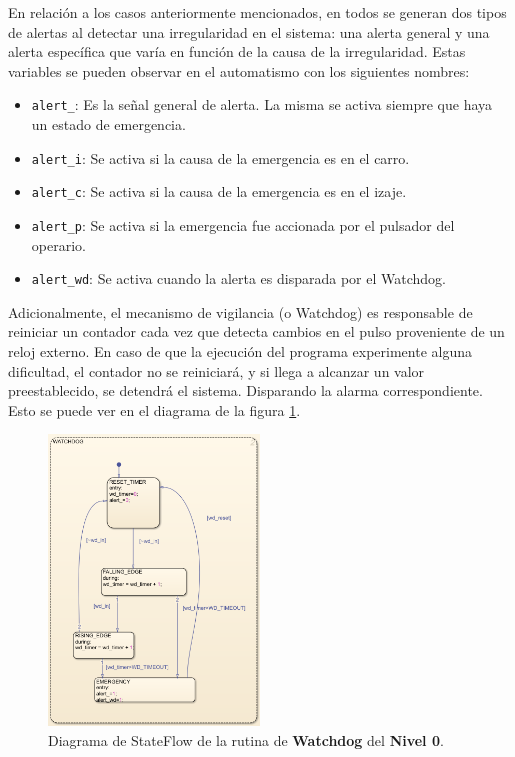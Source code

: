 \documentclass[11pt]{article}
\begin{document}
En relación a los casos anteriormente mencionados, en todos se generan dos tipos de alertas al detectar una irregularidad en el sistema: una alerta general y una alerta específica que varía en función de la causa de la irregularidad. Estas variables se pueden observar en el automatismo con los siguientes nombres:

\begin{itemize}
	\item \texttt{alert\_}: Es la señal general de alerta. La misma se activa siempre que haya un estado de emergencia.
	\item \texttt{alert\_i}: Se activa si la causa de la emergencia es en el carro.
	\item \texttt{alert\_c}: Se activa si la causa de la emergencia es en el izaje.
	\item \texttt{alert\_p}: Se activa si la emergencia fue accionada por el pulsador del operario.
	\item \texttt{alert\_wd}: Se activa cuando la alerta es disparada por el Watchdog.
\end{itemize}

Adicionalmente, el mecanismo de vigilancia (o Watchdog) es responsable de reiniciar un contador cada vez que detecta cambios en el pulso proveniente de un reloj externo. En caso de que la ejecución del programa experimente alguna dificultad, el contador no se reiniciará, y si llega a alcanzar un valor preestablecido, se detendrá el sistema. Disparando la alarma correspondiente. Esto se puede ver en el diagrama de la figura \ref{fig:nivel_0_watchdog}.

\begin{figure}[!h]
	\centering
	\includegraphics[width=0.5\textwidth]{images/imagen_28_watchdog.png}
	\caption{Diagrama de StateFlow de la rutina de \textbf{Watchdog} del \textbf{Nivel 0}.}
	\label{fig:nivel_0_watchdog}
\end{figure}
\end{document}
